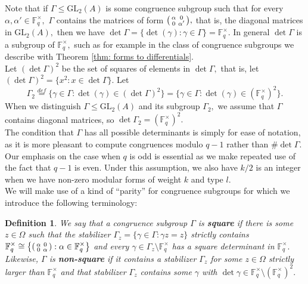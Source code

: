 \documentclass[11pt]{amsart}
\newtheorem{definition}[theorem]{Definition}
\theoremstyle{definition}
\newenvironment{psmallmatrix}
{\left(\begin{smallmatrix}}
	{\end{smallmatrix}\right)}
\numberwithin{equation}{section}
\newcommand{\GL}{\mathrm{GL}} 	%
\newcommand{\bbF}{\mathbb{F}}		%
\begin{document}
		Note that if $\Gamma\leq \GL_2(A)$ is some congruence subgroup such that 
		for every $\alpha,\alpha'\in \bbF_q^{\times},$ $\Gamma$ contains the matrices of form $\displaystyle{\begin{psmallmatrix}\alpha&0\\0&\alpha'\end{psmallmatrix}},$ that is, the diagonal matrices in $\GL_2(A),$ then we have
		$\det\Gamma=\{\det(\gamma):\gamma\in \Gamma\}=\bbF_q^{\times}.$ In general $\det\Gamma$ is a subgroup of $\bbF_q^{\times},$ such as for example in the class of congruence subgroups we describe with Theorem \ref{thm: forms to differentials}.\\
		
		Let $(\det\Gamma)^2$ be the set of squares of elements in $\det\Gamma,$ that is, let $(\det\Gamma)^2=\{x^2: x\in \det\Gamma\}.$ Let \[\Gamma_2\overset{def}{=}\{\gamma\in \Gamma:\det(\gamma)\in (\det\Gamma)^2\}=\{\gamma\in \Gamma:\det(\gamma)\in (\bbF_q^{\times})^2\}.\]
		When we distinguish $\Gamma\leq \GL_2(A)$ and its subgroup $\Gamma_2,$ we assume that $\Gamma$ contains diagonal matrices, so $\det\Gamma_2=(\bbF_q^{\times})^2.$\\
		
		The condition that $\Gamma$ has all possible determinants is simply for ease of notation, as it is more pleasant to compute congruences modulo $q-1$ rather than $\#\det\Gamma.$ Our emphasis on the case when $q$ is odd is essential as we make repeated use of the fact that $q-1$ is even. Under this assumption, we also have $k/2$ is an integer when we have non-zero modular forms of weight $k$ and type $l.$ \\ 

		We will make use of a kind of  ``parity'' for congruence subgroups for which we introduce the following terminology:
		\begin{definition}
			We say that a congruence subgroup $\Gamma$ is \textbf{square} if there is some $z\in \Omega$ such that the stabilizer $\Gamma_z=\{\gamma\in \Gamma: \gamma z=z\}$ strictly contains 
			$\displaystyle{\bbF_q^{\times}\cong \left\{\begin{psmallmatrix}\alpha&0\\0&\alpha\end{psmallmatrix}:\alpha\in \bbF_q^{\times}\right\}}$ and every $\gamma\in \Gamma_z\setminus \bbF_q^{\times}$ has a square determinant in $\bbF_q^{\times}.$ Likewise, $\Gamma$ is \textbf{non-square} if it contains a stabilizer $\Gamma_z$ for some $z\in \Omega$ strictly larger than $\bbF_q^{\times}$ and that stabilizer $\Gamma_z$ contains some $\gamma$ with $\det\gamma\in \bbF_q^{\times}\setminus (\bbF_q^{\times})^2.$
		\end{definition}
		
\end{document}
